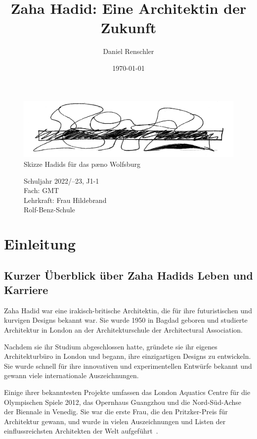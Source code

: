 \documentclass[a4paper, 12p]{article}
\begin{document}
\title{Zaha Hadid: Eine Architektin der Zukunft}
\author{Daniel Renschler}
\date{\today}
\maketitle

\begin{figure}[h]
\includegraphics[width=\linewidth]{paeno-sketch.jpg}
\caption{Skizze Hadids für das pæno Wolfsburg\cite{article_creative_energy_sketches}}
\end{figure}

\begin{figure}[!h]
\centering
\large
Schuljahr 2022/–23, J1-1 \\
Fach: GMT \\
Lehrkraft: Frau Hildebrand \\
Rolf-Benz-Schule 

\end{figure}
\thispagestyle{empty}
\clearpage
\tableofcontents
\clearpage


\section{Einleitung}
\subsection{Kurzer Überblick über Zaha Hadids Leben und Karriere}
Zaha Hadid war eine irakisch-britische Architektin, die für ihre futuristischen
und kurvigen Designs bekannt war. Sie wurde 1950 in Bagdad geboren und studierte
Architektur in London an der Architekturschule der Architectural
Association.\cite{hadid_britannica}

Nachdem sie ihr Studium abgeschlossen hatte, gründete sie ihr eigenes
Architekturbüro in London und begann, ihre einzigartigen Designs zu entwickeln.
Sie wurde schnell für ihre innovativen und experimentellen Entwürfe bekannt und
gewann viele internationale Auszeichnungen.

Einige ihrer bekanntesten Projekte umfassen das London Aquatics Centre für die
Olympischen Spiele 2012, das Opernhaus Guangzhou und die Nord-Süd-Achse
der Biennale in Venedig. Sie war die erste Frau, die den Pritzker-Preis für
Architektur gewann, und wurde in vielen Auszeichnungen und Listen der
einflussreichsten Architekten der Welt aufgeführt~\cite{ZahaHadidAwards}.
\end{document}
